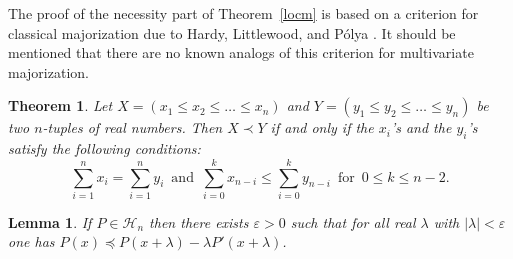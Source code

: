 \documentclass[10pt,twoside,a4paper,reqno]{amsart}
\theoremstyle{plain}
\newtheorem{theo+}           {Theorem}
\newtheorem{lemm+}           {Lemma}
\theoremstyle{definition}
\theoremstyle{remark}
\newenvironment{theorem}{\begin{theo+}}{\end{theo+}}
\newenvironment{lemma}{\begin{lemm+}}{\end{lemm+}}
\newcommand {\la} {\lambda}
\newcommand {\ve} {\varepsilon}
\newcommand {\calH} {\mathcal {H}}
\begin{document}
The proof of the necessity part of Theorem~\ref{locm} is based on a
criterion for classical majorization due to Hardy, 
Littlewood, and P\'olya \cite{HLP}. It should be mentioned that there are no 
known analogs of this criterion for multivariate majorization.

\begin{theorem}\label{crit}
Let $X=(x_{1}\le x_{2} \le\ldots \le x_{n})$ and
$Y=(y_{1}\le y_{2} \le \ldots \le y_{n})$ be two $n$-tuples of 
real numbers. Then $X\prec Y$ if and only if the $x_{i}$'s and the 
$y_{i}$'s 
satisfy the following conditions:
$$\sum_{i=1}^{n}x_{i}=\sum_{i=1}^{n}y_{i}\,\text{ and }\,
\sum_{i=0}^{k}x_{n-i}\le \sum_{i=0}^{k}y_{n-i}\,\text{ for }\,
0\le k\le n-2.$$
\end{theorem}

\begin{lemma}\label{nec}
If $P\in \calH_n$ then there exists $\ve>0$ such that for all real $\la$ with 
$|\la|<\ve$ one has $P(x)\preccurlyeq P(x+\la)-\la P'(x+\la)$.
\end{lemma}
\end{document}
